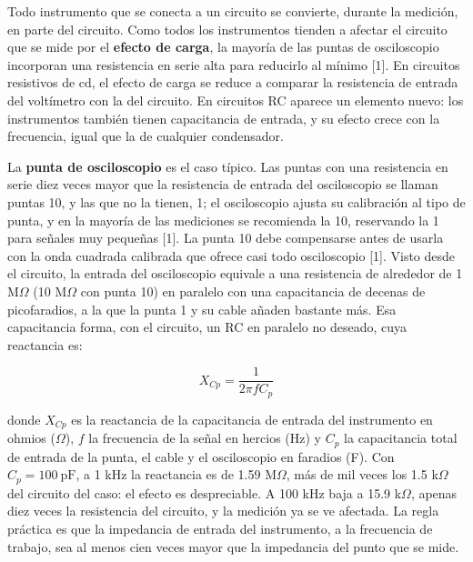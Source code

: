 \documentclass[11pt,letterpaper]{article}
\begin{document}
Todo instrumento que se conecta a un circuito se convierte, durante la medición, en parte del circuito. Como todos los instrumentos tienden a afectar el circuito que se mide por el \textbf{efecto de carga}, la mayoría de las puntas de osciloscopio incorporan una resistencia en serie alta para reducirlo al mínimo [1]. En circuitos resistivos de cd, el efecto de carga se reduce a comparar la resistencia de entrada del voltímetro con la del circuito. En circuitos RC aparece un elemento nuevo: los instrumentos también tienen capacitancia de entrada, y su efecto crece con la frecuencia, igual que la de cualquier condensador.

La \textbf{punta de osciloscopio} es el caso típico. Las puntas con una resistencia en serie diez veces mayor que la resistencia de entrada del osciloscopio se llaman puntas \texttimes{}10, y las que no la tienen, \texttimes{}1; el osciloscopio ajusta su calibración al tipo de punta, y en la mayoría de las mediciones se recomienda la \texttimes{}10, reservando la \texttimes{}1 para señales muy pequeñas [1]. La punta \texttimes{}10 debe compensarse antes de usarla con la onda cuadrada calibrada que ofrece casi todo osciloscopio [1]. Visto desde el circuito, la entrada del osciloscopio equivale a una resistencia de alrededor de 1 M\ensuremath{\Omega} (10 M\ensuremath{\Omega} con punta \texttimes{}10) en paralelo con una capacitancia de decenas de picofaradios, a la que la punta \texttimes{}1 y su cable añaden bastante más. Esa capacitancia forma, con el circuito, un RC en paralelo no deseado, cuya reactancia es:

\begin{equation}
  X_{Cp} = \frac{1}{2\pi f C_p}
\end{equation}

donde $X_{Cp}$ es la reactancia de la capacitancia de entrada del instrumento en ohmios (\ensuremath{\Omega}), $f$ la frecuencia de la señal en hercios (Hz) y $C_p$ la capacitancia total de entrada de la punta, el cable y el osciloscopio en faradios (F). Con $C_p = 100\ \text{pF}$, a 1 kHz la reactancia es de 1.59 M\ensuremath{\Omega}, más de mil veces los 1.5 k\ensuremath{\Omega} del circuito del caso: el efecto es despreciable. A 100 kHz baja a 15.9 k\ensuremath{\Omega}, apenas diez veces la resistencia del circuito, y la medición ya se ve afectada. La regla práctica es que la impedancia de entrada del instrumento, a la frecuencia de trabajo, sea al menos cien veces mayor que la impedancia del punto que se mide.
\end{document}
